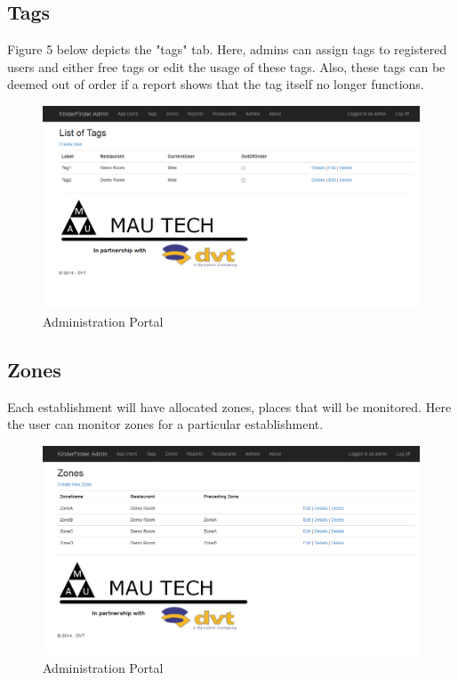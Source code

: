 \documentclass{article}
\begin{document}
\subsection{Tags}
Figure 5 below depicts the "tags" tab. Here, admins can assign tags to registered users and either free tags or edit the usage of these tags. Also, these tags can be deemed out of order if a report shows that the tag itself no longer functions.
\begin{figure}[H]
\centering
\includegraphics[scale=0.4]{tags.png}
\caption{Administration Portal}
\end{figure}

\subsection{Zones}
Each establishment will have allocated zones, places that will be monitored. Here the user can monitor zones for a particular establishment.
\begin{figure}[H]
\centering
\includegraphics[scale=0.4]{zones.png}
\caption{Administration Portal}
\end{figure}
\end{document}
